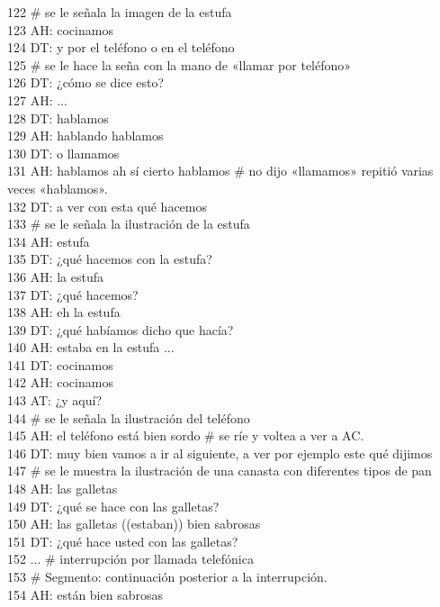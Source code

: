 122 \# se le señala la imagen de la estufa\\
123 AH: cocinamos\\
124 DT: y por el teléfono o en el teléfono\\
125 \# se le hace la seña con la mano de «llamar por teléfono»\\
126 DT: ¿cómo se dice esto?\\
127 AH: ...\\
128 DT: hablamos\\
129 AH: hablando hablamos\\
130 DT: o llamamos\\
131 AH: hablamos ah sí cierto hablamos \# no dijo «llamamos» repitió varias veces «hablamos».\\
132 DT: a ver con esta qué hacemos\\
133 \# se le señala la ilustración de la estufa\\
134 AH: estufa\\
135 DT: ¿qué hacemos con la estufa?\\
136 AH: la estufa\\
137 DT: ¿qué hacemos?\\
138 AH: eh la estufa\\
139 DT: ¿qué habíamos dicho que hacía?\\
140 AH: estaba en la estufa ...\\
141 DT: cocinamos\\
142 AH: cocinamos\\
143 AT: ¿y aquí?\\
144 \# se le señala la ilustración del teléfono\\
145 AH: el teléfono está bien sordo \# se ríe y voltea a ver a AC.\\
146 DT: muy bien vamos a ir al siguiente, a ver por ejemplo este qué dijimos\\
147 \# se le muestra la ilustración de una canasta con diferentes tipos de pan\\
148 AH: las galletas\\
149 DT: ¿qué se hace con las galletas?\\
150 AH: las galletas ((estaban)) bien sabrosas\\
151 DT: ¿qué hace usted con las galletas?\\
152 ... \# interrupción por llamada telefónica\\
153 \# Segmento: continuación posterior a la interrupción.\\
154 AH: están bien sabrosas\\
